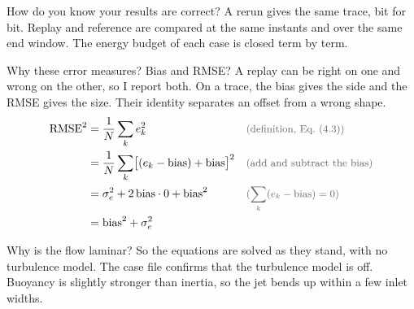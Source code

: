 \begin{qabox}{How do you know your results are correct?}
\explain A rerun gives the same trace, bit for bit. Replay and reference are compared at the same
instants and over the same end window. The energy budget of each case is closed term by term.
\end{qabox}

\begin{qabox}{Why these error measures? Bias and RMSE?}
\explain A replay can be right on one and wrong on the other, so I report both. On a trace, the
bias gives the side and the RMSE gives the size. Their identity separates an offset from a wrong
shape.
\derive
\begin{align*}
\mathrm{RMSE}^2 &= \frac1N\sum_k e_k^2 \why{definition, Eq.~(4.3)} \\
 &= \frac1N\sum_k \bigl[(e_k-\mathrm{bias}) + \mathrm{bias}\bigr]^2 \why{add and subtract the bias} \\
 &= \sigma_e^2 + 2\,\mathrm{bias}\cdot 0 + \mathrm{bias}^2 \why{$\sum_k (e_k - \mathrm{bias}) = 0$} \\
 &= \mathrm{bias}^2 + \sigma_e^2
\end{align*}
\end{qabox}

\begin{qabox}{Why is the flow laminar?}
\explain So the equations are solved as they stand, with no turbulence model. The case file
confirms that the turbulence model is off. Buoyancy is slightly stronger than inertia, so the jet
bends up within a few inlet widths.
\end{qabox}

